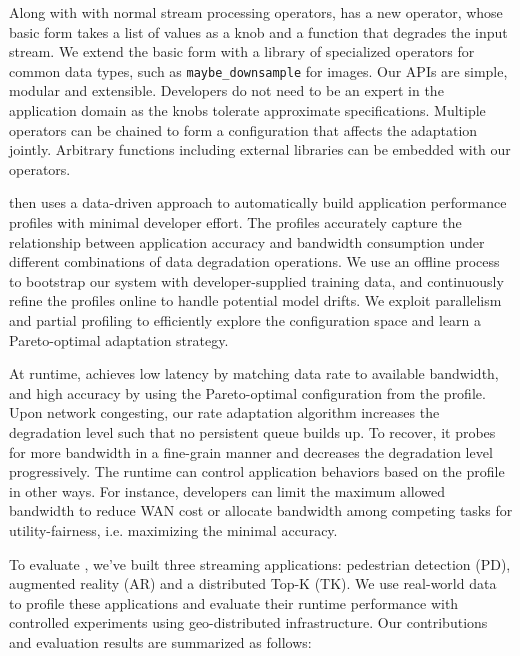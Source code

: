 Along with with normal stream processing operators, \sysname{} has a new
\maybe{} operator, whose basic form takes a list of values as a knob and a
function that degrades the input stream. We extend the basic form with a library
of specialized operators for common data types, such as
\texttt{maybe\_downsample} for images.  Our APIs are simple, modular and
extensible. Developers do not need to be an expert in the application domain as
the knobs tolerate approximate specifications. Multiple operators can be chained
to form a configuration that affects the adaptation jointly. Arbitrary functions
including external libraries can be embedded with our operators.

\sysname{} then uses a data-driven approach to automatically build application
performance profiles with minimal developer effort. The profiles accurately
capture the relationship between application accuracy and bandwidth consumption
under different combinations of data degradation operations. We use an offline
process to bootstrap our system with developer-supplied training data, and
continuously refine the profiles online to handle potential model drifts. We
exploit parallelism and partial profiling to efficiently explore the
configuration space and learn a Pareto-optimal adaptation strategy.

At runtime, \sysname{} achieves low latency by matching data rate to available
bandwidth, and high accuracy by using the Pareto-optimal configuration from the
profile. Upon network congesting, our rate adaptation algorithm increases the
degradation level such that no persistent queue builds up. To recover, it probes
for more bandwidth in a fine-grain manner and decreases the degradation level
progressively. The runtime can control application behaviors based on the
profile in other ways. For instance, developers can limit the maximum allowed
bandwidth to reduce WAN cost or allocate bandwidth among competing tasks for
utility-fairness, i.e. maximizing the minimal accuracy.

To evaluate \sysname{}, we've built three streaming applications: pedestrian
detection (PD), augmented reality (AR) and a distributed Top-K (TK). We use
real-world data to profile these applications and evaluate their runtime
performance with controlled experiments using geo-distributed
infrastructure. Our contributions and evaluation results are summarized as
follows:

